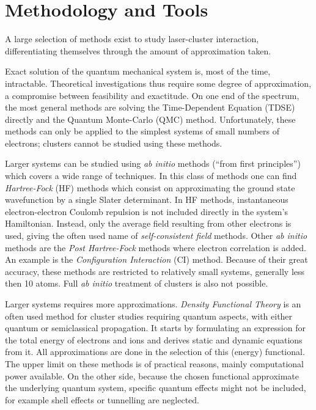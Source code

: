\clearpage
\section{Methodology and Tools}
\label{section:tools}

A large selection of methods exist to study laser-cluster interaction,
differentiating themselves through the amount of approximation taken.

Exact solution of the quantum mechanical system is, most of the time,
intractable. Theoretical investigations thus require some degree of
approximation, a compromise between feasibility and exactitude. On one end of
the spectrum, the most general methods are solving the
Time-Dependent \schrodinger Equation (TDSE) directly and the Quantum Monte-Carlo
(QMC) method. Unfortunately, these methods can only be applied to the simplest
systems of small numbers of electrons; clusters cannot be studied using these
methods.

Larger systems can be studied using \textit{ab initio} methods (``from
first principles'') which covers a wide range of techniques. In this class of
methods one can find \textit{Hartree-Fock} (HF) methods which consist on
approximating the ground state wavefunction by a single Slater determinant.
In HF methods, instantaneous electron-electron Coulomb repulsion is not
included directly in the system's Hamiltonian. Instead, only the average field
resulting from other electrons is used, giving the often used name of
\textit{self-consistent field} methods. Other \textit{ab
initio} methods are the \textit{Post Hartree-Fock} methods where electron
correlation is added. An example is the \textit{Configuration Interaction} (CI)
method. Because of their great accuracy, these methods are restricted to
relatively small systems, generally less then 10 atoms. Full \textit{ab initio}
treatment of clusters is also not possible.

Larger systems requires more approximations. \textit{Density Functional Theory}
is an often used method for cluster studies requiring quantum aspects, with
either quantum or semiclassical propagation. It starts by formulating an
expression for the total energy of electrons and ions and derives static and
dynamic equations from it. All approximations are done in the selection of this
(energy) functional. The upper limit on these methods is of practical reasons,
mainly computational power available. On the other side, because the chosen
functional approximate the underlying quantum system, specific quantum effects
might not be included, for example shell effects or tunnelling are neglected.

